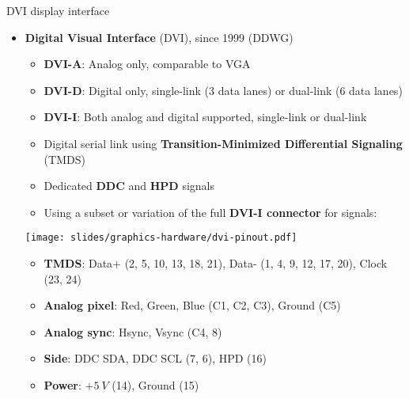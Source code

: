 \begin{frame}{DVI display interface}
  \begin{itemize}
  \item \textbf{Digital Visual Interface} (DVI), since 1999 (DDWG)
    \begin{itemize}
    \item \textbf{DVI-A}: Analog only, comparable to VGA
    \item \textbf{DVI-D}: Digital only, single-link (3 data lanes) or dual-link (6 data lanes)
    \item \textbf{DVI-I}: Both analog and digital supported, single-link or dual-link
    \item Digital serial link using \textbf{Transition-Minimized Differential Signaling} (TMDS)
    \item Dedicated \textbf{DDC} and \textbf{HPD} signals
    \item Using a subset or variation of the full \textbf{DVI-I connector} for signals:
    \end{itemize}
  \begin{center}
    \texttt{[image: slides/graphics-hardware/dvi-pinout.pdf]}
  \end{center}
  \begin{itemize}
  \item \textbf{TMDS}: Data+ {\footnotesize(2, 5, 10, 13, 18, 21)}, Data- {\footnotesize(1, 4, 9, 12, 17, 20)}, Clock {\footnotesize(23, 24)}
  \item \textbf{Analog pixel}: Red, Green, Blue {\footnotesize(C1, C2, C3)}, Ground {\footnotesize(C5)}
  \item \textbf{Analog sync}: Hsync, Vsync {\footnotesize(C4, 8)}
  \item \textbf{Side}: DDC SDA, DDC SCL {\footnotesize(7, 6)}, HPD {\footnotesize(16)}
  \item \textbf{Power}: \(+5~V\) {\footnotesize(14)}, Ground {\footnotesize(15)}
  \end{itemize}
  \end{itemize}
\end{frame}

